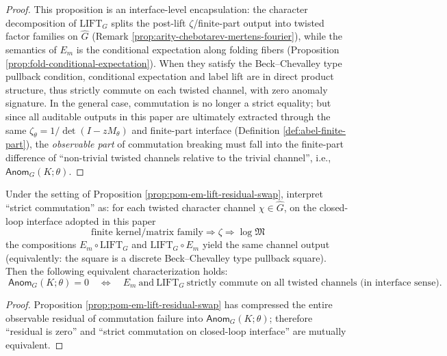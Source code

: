 \begin{proof}
This proposition is an interface-level encapsulation: the character decomposition of \(\mathrm{LIFT}_G\) splits the post-lift \(\zeta\)/finite-part output into twisted factor families on \(\widehat G\) (Remark \ref{prop:arity-chebotarev-mertens-fourier}), while the semantics of \(E_m\) is the conditional expectation along folding fibers (Proposition \ref{prop:fold-conditional-expectation}).
When they satisfy the Beck--Chevalley type pullback condition, conditional expectation and label lift are in direct product structure, thus strictly commute on each twisted channel, with zero anomaly signature.
In the general case, commutation is no longer a strict equality; but since all auditable outputs in this paper are ultimately extracted through the same \(\zeta_\theta=1/\det(I-zM_\theta)\) and finite-part interface (Definition \ref{def:abel-finite-part}), the \emph{observable part} of commutation breaking must fall into the finite-part difference of ``non-trivial twisted channels relative to the trivial channel'', i.e., \(\mathsf{Anom}_G(K;\theta)\).
\end{proof}

\begin{corollary}\label{cor:pom-zero-anom-pullback-exactness}
Under the setting of Proposition \ref{prop:pom-em-lift-residual-swap}, interpret ``strict commutation'' as: for each twisted character channel \(\chi\in\widehat G\), on the closed-loop interface adopted in this paper
\[
\text{finite kernel/matrix family}\Rightarrow \zeta \Rightarrow \log\mathfrak{M}
\]
the compositions \(E_m\circ \mathrm{LIFT}_G\) and \(\mathrm{LIFT}_G\circ E_m\) yield the same channel output (equivalently: the square is a discrete Beck--Chevalley type pullback square).
Then the following equivalent characterization holds:
\[
\boxed{\;
\mathsf{Anom}_G(K;\theta)=0
\quad\Longleftrightarrow\quad
E_m\ \text{and}\ \mathrm{LIFT}_G\ \text{strictly commute on all twisted channels (in interface sense)}.}
\]
\end{corollary}

\begin{proof}
Proposition \ref{prop:pom-em-lift-residual-swap} has compressed the entire observable residual of commutation failure into \(\mathsf{Anom}_G(K;\theta)\);
therefore ``residual is zero'' and ``strict commutation on closed-loop interface'' are mutually equivalent.
\end{proof}


